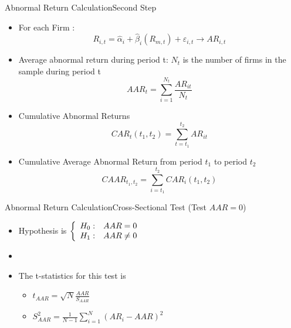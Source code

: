 \documentclass{beamer}
\begin{document}
	
	\begin{frame}{Abnormal Return Calculation}{Second Step}
		\begin{itemize}
			\scriptsize
			\item For each Firm :
			\begin{equation*}
				R_{i,t} = \hat{\alpha}_i + \hat{\beta}_i (R_{m,t}) + \boxed{\varepsilon_{i,t}} \rightarrow AR_{i,t}
			\end{equation*}
			
			\item Average abnormal return during period t: 
			\tiny $ N_t $ is the number of firms in the sample during period t
			\scriptsize
			\begin{equation*}
				AAR_t = \sum_{i=1}^{N_t} \frac{AR_{it}}{N_t}
			\end{equation*}
			\item Cumulative Abnormal Returns
			\begin{equation*}
				CAR_t(t_1,t_2) = \sum_{t=t_1}^{t_2} {AR_{it}}
			\end{equation*}
			\item Cumulative Average Abnormal Return from period $ t_1 $ to period $ t_2 $
			\begin{equation*}
				CAAR_{t_1,t_2} = \sum_{i=t_1}^{t_2} CAR_i(t_1,t_2)
			\end{equation*}
		\end{itemize}
	\end{frame}
	
	
	\begin{frame}{Abnormal Return Calculation}{Cross-Sectional Test (Test $ AAR=0 $)}
		
		
		\begin{itemize}
			\item Hypothesis is  $\left\{\begin{array}{c c }
				H_0: & AAR=0\\
				H_1: & AAR\neq 0
			\end{array}\right.
			$\\
			\item[]
			\item The t-statistics for this test is 
			\begin{itemize}
				\item 
				$
				t_{AAR} = \sqrt{N}\frac{AAR}{S_{AAR}}
				$
				\item 
				$
				S^2_{AAR} = \frac{1}{N-1}\sum_{i = 1}^{N}(AR_i - {AAR})^2
				$
			\end{itemize}
		\end{itemize}
		
		
		
	\end{frame}
	
\end{document}
